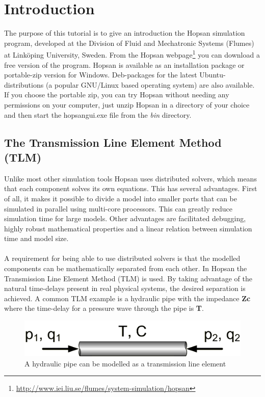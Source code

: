 \documentclass[a4paper,pdftex]{article}
\begin{document}

\section*{Introduction}
The purpose of this tutorial is to give an introduction the Hopsan simulation program, developed at the Division of Fluid and Mechatronic Systems (Flumes) at Linköping University, Sweden.
From the Hopsan webpage\footnote{\url{http://www.iei.liu.se/flumes/system-simulation/hopsan}} you can download a free version of the program.
Hopsan is available as an installation package or portable-zip version for Windows.
Deb-packages for the latest Ubuntu-distributions (a popular GNU/Linux based operating system) are also available.
If you choose the portable zip, you can try Hopsan without needing any permissions on your computer, just unzip Hopsan in a directory of your choice and then start the hopsangui.exe file from the \textit{bin} directory.

\subsection*{The Transmission Line Element Method (TLM)}
Unlike most other simulation tools Hopsan uses distributed solvers, which means that each component solves its own equations.
This has several advantages. 
First of all, it makes it possible to divide a model into smaller parts that can be simulated in parallel using multi-core processors. This can greatly reduce simulation time for large models.
Other advantages are facilitated debugging, highly robust mathematical properties and a linear relation between simulation time and model size. 
\\\\
\noindent A requirement for being able to use distributed solvers is that the modelled components can be mathematically separated from each other. 
In Hopsan the Transmission Line Element Method (TLM) is used.
By taking advantage of the natural time-delays present in real physical systems, the desired separation is achieved.
A common TLM example is a hydraulic pipe with the impedance \textbf{Zc} where the time-delay for a pressure wave through the pipe is \textbf{T}.

\begin{figure}[hbt]
  \centering
  \includegraphics[width=0.6\linewidth]{gfx/PosterTransmissionLines.png}
  \caption{A hydraulic pipe can be modelled as a transmission line element}
  \label{fig:hydraulic_pipe}
\end{figure}
\end{document}
